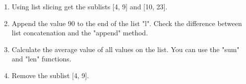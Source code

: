 \begin{enumerate}

\item Using list slicing get the sublists [4, 9] and [10, 23].

\item Append the value 90 to the end of the list "l". Check the difference between list concatenation and the "append" method.

\item Calculate the average value of all values on the list. You can use the "sum" and "len" functions.

\item Remove the sublist [4, 9].

\end{enumerate}